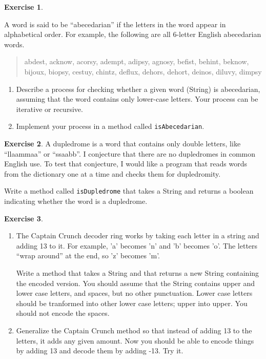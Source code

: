 \documentclass[12pt]{book}
\theoremstyle{definition}
\newtheorem{excz}{Exercise}[chapter]
\newenvironment{exercise}{\bigskip\begin{excz}\mbox{}}{\end{excz}}
\begin{document}
\begin{exercise}
\label{abecedarian}

A word is said to be ``abecedarian'' if the letters in the
word appear in alphabetical order.  For example, the following
are all 6-letter English abecedarian words.

\begin {quote}
abdest, acknow, acorsy, adempt, adipsy, agnosy, befist, behint,
beknow, bijoux, biopsy, cestuy, chintz, deflux, dehors, dehort,
deinos, diluvy, dimpsy
\end{quote}

\begin{enumerate}

\item Describe a process for checking whether a given word (String)
is abecedarian, assuming that the word contains only lower-case
letters.  Your process can be iterative or recursive.

\item Implement your process in a method called {\tt isAbecedarian}.

\end{enumerate}
\end{exercise}


\begin{exercise}
\label{dupledrome}
A dupledrome is a word that contains only double letters,
like ``llaammaa'' or ``ssaabb''.  I conjecture that there
are no dupledromes in common English use.  To test that
conjecture, I would like a program that reads
words from the dictionary one at a time and checks them for
dupledromity.

Write a method called {\tt isDupledrome} that takes a String
and returns a boolean indicating whether the word is a dupledrome.
\end{exercise}



\begin{exercise}
\begin{enumerate}

\item The Captain Crunch decoder ring works by taking each letter in a
string and adding 13 to it.  For example, 'a' becomes 'n' and 'b'
becomes 'o'.  The letters ``wrap around'' at the end, so 'z' becomes
'm'.

Write a method that takes a String and that returns a new String
containing the encoded version.  You should assume that the String
contains upper and lower case letters, and spaces, but no other
punctuation.  Lower case letters should be tranformed into other lower
case letters; upper into upper.  You should not encode the spaces.

\item Generalize the Captain Crunch method so that instead of adding
13 to the letters, it adds any given amount.  Now you should be able
to encode things by adding 13 and decode them by adding -13.  Try it.

\end{enumerate}
\end{exercise}
\end{document}
